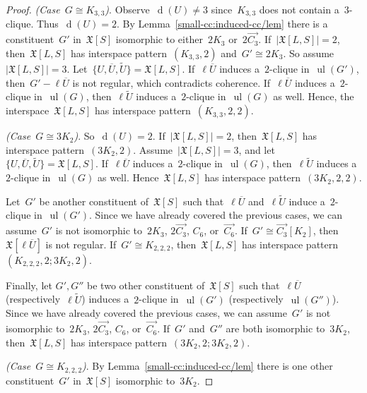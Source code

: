 \documentclass[english,a4paper]{article}
\theoremstyle{plain}
\theoremstyle{definition}
\newcommand{\coherentConfig}{\ensuremath{\mathfrak{X}}}
\newcommand{\interspace}[2]{\ensuremath{\coherentConfig[#1,#2]}}
\newcommand{\inducedCC}[1]{\ensuremath{\coherentConfig[#1]}}
\newcommand{\intDegree}[1]{\ensuremath{\Deg \left( #1 \right)}}
\DeclareMathOperator*{\ul}{ul}
\DeclareMathOperator{\Deg}{d}
\newcommand{\ipsixMatching}             {\ensuremath{(\disjointCliques{3}{2},2)}}
\newcommand{\ipsixMatchingTwice}        {\ensuremath{(\disjointCliques{3}{2},2,2)}}
\newcommand{\ipsixMatchingMatching}     {\ensuremath{(\disjointCliques{3}{2},2;\disjointCliques{3}{2},2)}}
\newcommand{\ipsixMatchingAndComplement}{\ensuremath{(\clique{2,2,2},2;\disjointCliques{3}{2},2)}}
\newcommand{\ipsixTriangleComplement}     {\ensuremath{(\clique{3,3},2)}}
\newcommand{\ipsixTriangleComplementTwice}{\ensuremath{(\clique{3,3},2,2)}}
\newcommand{\clique}[1]{\ensuremath{K_{#1}}}
\newcommand{\disjointCliques}[2]{\ensuremath{#1 \clique{#2}}}
\begin{document}
\begin{proof}
    \textit{(Case~$G \cong K_{3,3}$)}.
    Observe~$\intDegree{U} \neq 3$ since~$K_{3,3}$ does not contain a~$3$-clique.
    Thus~$\intDegree{U} = 2$.
    By Lemma~\ref{small-cc:induced-cc/lem} there is a constituent~$G'$ in~$\inducedCC{S}$ isomorphic to either~$2K_3$ or~$2\overrightarrow{C_3}$.
    If~$|\interspace{L}{S}| = 2$, then~$\interspace{L}{S}$ has interspace pattern~$\ipsixTriangleComplement$ and~$G' \cong 2K_3$.
    So assume~$|\interspace{L}{S}| = 3$.
    Let~$\{U,\overline{U},\widetilde{U}\} = \interspace{L}{S}$.
    If~$\ell \overline{U}$ induces a~$2$-clique in~$\ul(G')$, then~$G' - \ell \overline{U}$ is not regular, which contradicts coherence.
    If~$\ell \overline{U}$ induces a~$2$-clique in~$\ul(G)$, then~$\ell \widetilde{U}$ induces a~$2$-clique in~$\ul(G)$ as well.
    Hence, the interspace~$\interspace{L}{S}$ has interspace pattern~$\ipsixTriangleComplementTwice$.

    \textit{(Case~$G \cong 3 K_2$)}.
    So~$\intDegree{U} = 2$.
    If~$|\interspace{L}{S}| = 2$, then~$\interspace{L}{S}$ has interspace pattern~$\ipsixMatching$.
    Assume~$|\interspace{L}{S}| = 3$, and let~$\{U,\overline{U},\widetilde{U}\} = \interspace{L}{S}$.
    If~$\ell \overline{U}$ induces a~$2$-clique in~$\ul(G)$, then~$\ell \widetilde{U}$ induces a~$2$-clique in~$\ul(G)$ as well.
    Hence~$\interspace{L}{S}$ has interspace pattern~$\ipsixMatchingTwice$.

    Let~$G'$ be another constituent of~$\inducedCC{S}$ such that~$\ell \overline{U}$ and~$\ell \widetilde{U}$ induce a~$2$-clique in~$\ul(G')$.
    Since we have already covered the previous cases, we can assume~$G'$ is not isomorphic to~$2K_3$, $2\overrightarrow{C_3}$, $C_6$, or~$\overrightarrow{C_6}$.
    If~$G' \cong \overrightarrow{C_3}[K_2]$, then~$\coherentConfig[\ell \overline{U}]$ is not regular.
    If~$G' \cong K_{2,2,2}$, then~$\interspace{L}{S}$ has interspace pattern~$\ipsixMatchingAndComplement$.

    Finally, let $G', G''$ be two other constituent of~$\inducedCC{S}$ such that~$\ell \overline{U}$ (respectively~$\ell \widetilde{U}$) induces a~$2$-clique in~$\ul(G')$ (respectively~$\ul(G'')$).
    Since we have already covered the previous cases, we can assume~$G'$ is not isomorphic to~$2K_3$, $2\overrightarrow{C_3}$, $C_6$, or~$\overrightarrow{C_6}$.
    If~$G'$ and~$G''$ are both isomorphic to~$3K_2$, then~$\interspace{L}{S}$ has interspace pattern~$\ipsixMatchingMatching$.

    \textit{(Case~$G \cong K_{2,2,2}$)}.
    By Lemma~\ref{small-cc:induced-cc/lem} there is one other constituent~$G'$ in~$\inducedCC{S}$ isomorphic to~$3K_2$.


\end{proof}
\end{document}
